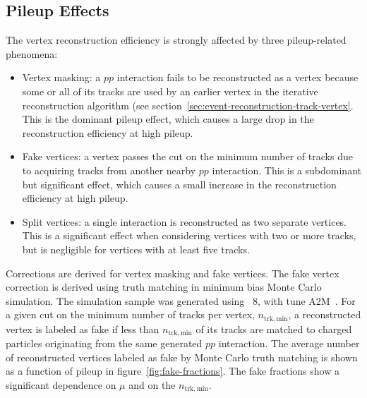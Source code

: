 \subsection{Pileup Effects}\label{sec:luminosity-vertex-pileup}
The vertex reconstruction efficiency is strongly affected by three pileup-related phenomena:

\begin{itemize}
	\item Vertex masking: a $pp$ interaction fails to be reconstructed as a vertex because some or all of its tracks are used by an earlier vertex in the iterative reconstruction algorithm (see section~\ref{sec:event-reconstruction-track-vertex}. This is the dominant pileup effect, which causes a large drop in the reconstruction efficiency at high pileup.
	\item Fake vertices: a vertex passes the cut on the minimum number of tracks due to acquiring tracks from another nearby $pp$ interaction. This is a subdominant but significant effect, which causes a small increase in the reconstruction efficiency at high pileup.
	\item Split vertices: a single interaction is reconstructed as two separate vertices. This is a significant effect when considering vertices with two or more tracks, but is negligible for vertices with at least five tracks.
\end{itemize}

Corrections are derived for vertex masking and fake vertices. The fake vertex correction is derived using truth matching in minimum bias Monte Carlo simulation. The simulation sample was generated using \pythia~8, with tune A2M~\cite{pythia8,AUET2}. For a given cut on the minimum number of tracks per vertex, $n_{\mathrm{trk,min}}$, a reconstructed vertex is labeled as fake if less than $n_{\mathrm{trk,min}}$ of its tracks are matched to charged particles originating from the same generated $pp$ interaction. The average number of reconstructed vertices labeled as fake by Monte Carlo truth matching is shown as a function of pileup in figure~\ref{fig:fake-fractions}. The fake fractions show a significant dependence on $\mu$ and on the $n_{\mathrm{trk,min}}$.



